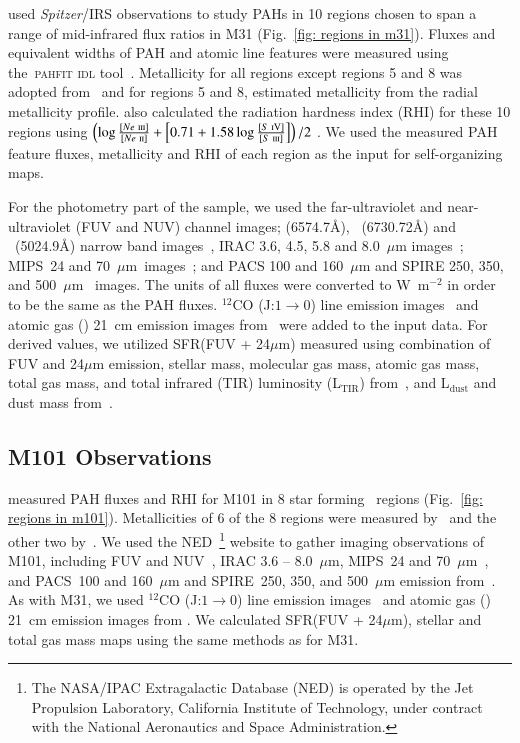      \cite{Dim15} used {\it Spitzer}/IRS observations to study PAHs in 10 regions chosen to span a range of mid-infrared flux ratios in M31 (Fig.~\ref{fig: regions in m31}). 
     Fluxes and equivalent widths of PAH and atomic line features were measured using the~\textsc{pahfit idl} tool~\citep{Smith07b}.
     Metallicity for all regions except regions 5 and 8 was adopted from~\citep{Sanders12} and for regions 5 and 8, \cite{Dim15} estimated metallicity from the radial metallicity profile.
     \cite{Dim15} also calculated the radiation hardness index (RHI) for these 10 regions using $\left (\log \frac{[Ne~\textsc{iii}]}{[Ne~\textsc{ii}]} + \left [ 0.71 + 1.58\log\frac{[S~\textsc{iV}]}{[S~\textsc{iii}]} \right ] \right )/2$ \citep{}. %
     We used the measured PAH feature fluxes, metallicity and RHI of each region as the input for self-organizing maps.
     
    For the photometry part of the sample, we used the \GALEX \citep{Martin05} far-ultraviolet and near-ultraviolet (FUV and NUV) channel images; \halpha (6574.7\AA), \sii~(6730.72\AA) and \oiii~(5024.9\AA) narrow band images~\citep{Massey07}, IRAC 3.6, 4.5, 5.8 and 8.0~$\mu$m images~\citep{Barmby06}; MIPS~24 and 70~$\mu$m~images~\citep{Gordon06}; and PACS 100 and 160~$\mu$m and SPIRE 250, 350, and 500~$\mu$m~\citep{Fritz12} images.
     The units of all fluxes were converted to W~m$^{-2}$ in order to be the same as the PAH fluxes.
     $^{12}$CO (J:$1\rightarrow0$) line emission images~\citep{Nieten06} and atomic gas (\hi) 21~cm emission images from~\cite{Chemin09} were added to the input data. 
     For derived values, we utilized SFR(FUV + 24$\mu$m) measured using combination of FUV and 24$\mu$m emission, stellar mass, molecular gas mass, atomic gas mass, total gas mass, and total infrared (TIR) luminosity (L$_\mathrm{TIR}$) from~\cite{Rahmani16}, and L$_\mathrm{dust}$ and dust mass from~\cite{Draine14}.
     
    \subsection{M101 Observations}
    \label{Sec: data_M101_SOMN} 
    
     \cite{Gordon08} measured PAH fluxes and RHI for M101 in 8 star forming \hii~regions (Fig.~\ref{fig: regions in m101}).
     Metallicities of 6 of the 8 regions were measured by~\cite{Kennicutt03} and the other two by~\cite{Gordon08}.
     We used the NED~\footnote{The NASA/IPAC Extragalactic Database (NED) is operated by the Jet Propulsion Laboratory, California Institute of Technology, under contract with the National Aeronautics and Space Administration.} website to gather imaging observations of M101, including 
      \GALEX FUV and NUV~\citep{depaz07}, IRAC 3.6 -- 8.0~$\mu$m, MIPS~24 and 70~$\mu$m~\citep{Dale09}, and PACS~100 and 160~$\mu$m and SPIRE~250, 350, and 500~$\mu$m emission from~\cite{Kennicutt11}.
     As with M31, we used $^{12}$CO (J:$1\rightarrow0$) line emission images~\citep{Helfer03} and atomic gas (\hi) 21~cm emission images from \cite{Walter08}.
     We calculated SFR(FUV + 24$\mu$m), stellar and total gas mass maps using the same methods as for M31.
     
